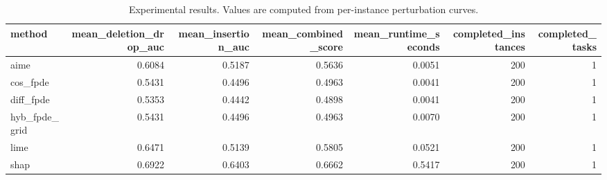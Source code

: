 \begin{table}[t]
\caption{Experimental results. Values are computed from per-instance perturbation curves.}
\label{tab:main_results_computed}
\centering
\begin{tabular}{lrrrrrr}
\toprule
method & mean\_deletion\_drop\_auc & mean\_insertion\_auc & mean\_combined\_score & mean\_runtime\_seconds & completed\_instances & completed\_tasks \\
\midrule
aime & 0.6084 & 0.5187 & 0.5636 & 0.0051 & 200 & 1 \\
cos\_fpde & 0.5431 & 0.4496 & 0.4963 & 0.0041 & 200 & 1 \\
diff\_fpde & 0.5353 & 0.4442 & 0.4898 & 0.0041 & 200 & 1 \\
hyb\_fpde\_grid & 0.5431 & 0.4496 & 0.4963 & 0.0070 & 200 & 1 \\
lime & 0.6471 & 0.5139 & 0.5805 & 0.0521 & 200 & 1 \\
shap & 0.6922 & 0.6403 & 0.6662 & 0.5417 & 200 & 1 \\
\bottomrule
\end{tabular}

\end{table}
